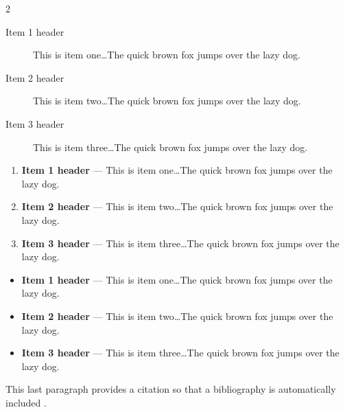 \documentclass[11pt]{article}%
\begin{document}
\begin{multicols}{2}
\begin{description}
\item[Item 1 header] This is item one\dots The quick brown fox jumps
over the lazy dog.
\item[Item 2 header] This is item two\dots The quick brown fox jumps
over the lazy dog.
\item[Item 3 header] This is item three\dots The quick brown fox jumps
over the lazy dog.
\end{description}

\begin{enumerate}
\item {\bf Item 1 header} --- This is item one\dots The quick brown fox jumps
over the lazy dog.
\item {\bf Item 2 header} --- This is item two\dots The quick brown fox jumps
over the lazy dog.
\item {\bf Item 3 header} --- This is item three\dots The quick brown fox jumps
over the lazy dog.
\end{enumerate}

\begin{itemize}
\item {\bf Item 1 header} --- This is item one\dots The quick brown fox jumps
over the lazy dog.
\item {\bf Item 2 header} --- This is item two\dots The quick brown fox jumps
over the lazy dog.
\item {\bf Item 3 header} --- This is item three\dots The quick brown fox jumps
over the lazy dog.
\end{itemize}

This last paragraph provides a citation so that a bibliography is
automatically included \cite{book:algorithms-4th-ed}.

\printbibliography %


\end{multicols}
\end{document}

